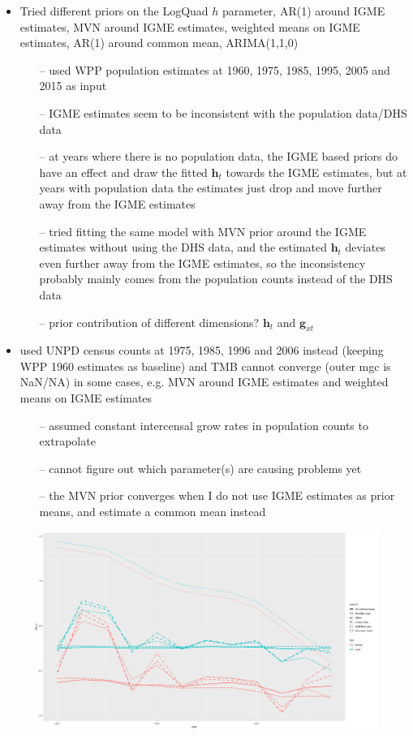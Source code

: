 \documentclass[12pt,a4paper]{article}
\date{\vspace{-5ex}}
\begin{document}
\begin{itemize}
\item Tried different priors on the LogQuad $h$ parameter, AR(1) around IGME estimates, MVN around IGME estimates, weighted means on IGME estimates, AR(1) around common mean, ARIMA(1,1,0) 
	\begin{itemize}
	\item[--] used WPP population estimates at 1960, 1975, 1985, 1995, 2005 and 2015 as input
	\item[--] IGME estimates seem to be inconsistent with the population data/DHS data
	\item[--] at years where there is no population data, the IGME based priors do have an effect and draw the fitted $\boldsymbol{h}_t$ towards the IGME estimates, but at years with population data the estimates just drop and move further away from the IGME estimates
	\item[--] tried fitting the same model with MVN prior around the IGME estimates without using the DHS data, and the estimated $\boldsymbol{h}_t$ deviates even further away from the IGME estimates, so the inconsistency probably mainly comes from the population counts instead of the DHS data 
	\item[--] prior contribution of different dimensions? $\boldsymbol{h}_t$ and $\boldsymbol{g}_{xt}$
	\end{itemize}
	
\item used UNPD census counts at 1975, 1985, 1996 and 2006 instead (keeping WPP 1960 estimates as baseline) and TMB cannot converge (outer mgc is NaN/NA) in some cases, e.g. MVN around IGME estimates and weighted means on IGME estimates
\begin{itemize}
\item[--] assumed constant intercensal grow rates in population counts to extrapolate
\item[--] cannot figure out which parameter(s) are causing problems yet
\item[--] the MVN prior converges when I do not use IGME estimates as prior means, and estimate a common mean instead
\end{itemize}
\end{itemize}

\begin{figure}[H]
\includegraphics[width = \linewidth]{Burkina Faso/h priors.jpg}
\end{figure}
\end{document}
